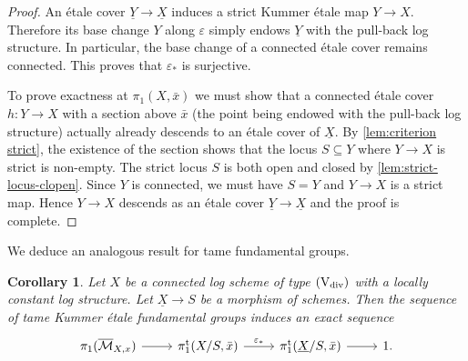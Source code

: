 \documentclass[a4paper,twoside,11pt,reqno]{amsart}
\newcommand{\cM}{{\mathcal M}}
\newcommand{\ov}[1]{\overline{#1}}
\newcommand{\ep}{\varepsilon}
\newcommand{\typeVd}{(\mathrm{V}_{\rm div})}
\newcommand{\pitame}{\pi_1^{\mathrm{t}}}
\newtheorem{cor}[thm]{Corollary}
\theoremstyle{definition}
\numberwithin{equation}{subsection}
\begin{document}
\begin{proof}
An \'etale cover $\underline{Y} \to \underline{X}$ induces a strict Kummer \'etale map $Y \to X$. Therefore its base change $Y$ along $\ep$ simply endows $\underline{Y}$ with the pull-back log structure. In particular, the base change of a connected \'etale cover remains connected. This proves that $\ep_\ast$ is surjective. 

To prove exactness at $\pi_1(X, \bar x)$ we must show that a connected \'etale cover $h\colon  Y \to X$ with a section above $\bar x$ (the point being endowed with the pull-back log structure) actually already descends to an \'etale  cover of $\underline{X}$. By \cref{lem:criterion strict}, the existence of the section shows that the locus $S \subseteq Y$ where $Y \to X$ is strict is non-empty. The strict locus $S$ is both open and closed by \cref{lem:strict-locus-clopen}.
Since $Y$ is connected, we must have $S=Y$ and $Y \to X$ is a strict map. Hence $Y \to X$ descends as an \'etale cover $\underline{Y} \to \underline{X}$ and the proof is complete.
\end{proof}

We deduce an analogous result for tame fundamental groups.

\begin{cor} \label{cor:torus-fibration-tame}
    Let $X$ be a connected log scheme of type $\typeVd$ with a locally constant log structure. 
    Let $\underline{X}\to S$ be a morphism of schemes. Then the sequence of tame Kummer \'etale fundamental groups induces an exact sequence
    \[
        \begin{tikzcd}
            \pi_1(\ov \cM_{X,x}) \ar[r] & \pitame(X/S,\bar x) \ar[r,"\ep_\ast"] & \pitame(\underline{X}/S,\bar x) \ar[r] & 1.
        \end{tikzcd}
    \]
\end{cor}
\end{document}
